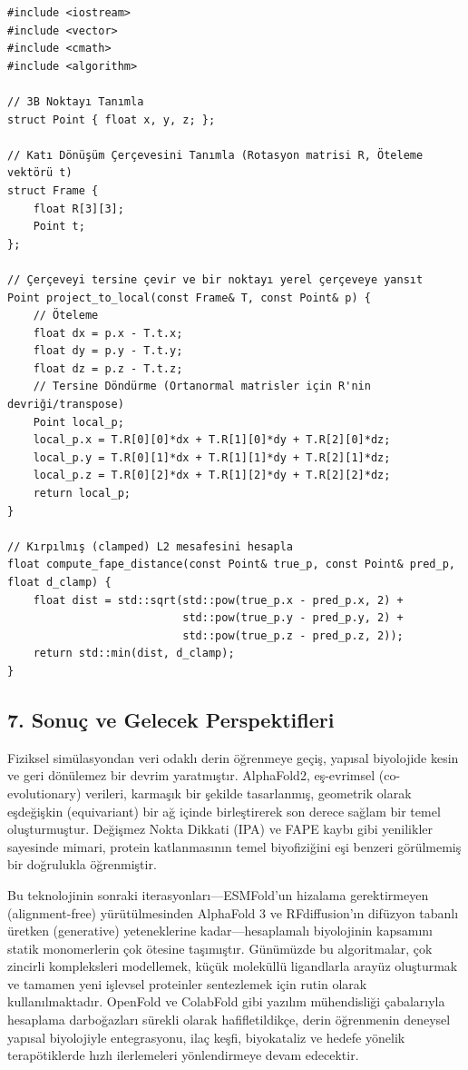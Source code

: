 \documentclass[11pt,a4paper]{article}
\begin{document}
\begin{Verbatim}[breaklines=true,breakanywhere=true,fontsize=\small]
#include <iostream>
#include <vector>
#include <cmath>
#include <algorithm>

// 3B Noktayı Tanımla
struct Point { float x, y, z; };

// Katı Dönüşüm Çerçevesini Tanımla (Rotasyon matrisi R, Öteleme vektörü t)
struct Frame {
    float R[3][3];
    Point t;
};

// Çerçeveyi tersine çevir ve bir noktayı yerel çerçeveye yansıt
Point project_to_local(const Frame& T, const Point& p) {
    // Öteleme
    float dx = p.x - T.t.x;
    float dy = p.y - T.t.y;
    float dz = p.z - T.t.z;
    // Tersine Döndürme (Ortanormal matrisler için R'nin devriği/transpose)
    Point local_p;
    local_p.x = T.R[0][0]*dx + T.R[1][0]*dy + T.R[2][0]*dz;
    local_p.y = T.R[0][1]*dx + T.R[1][1]*dy + T.R[2][1]*dz;
    local_p.z = T.R[0][2]*dx + T.R[1][2]*dy + T.R[2][2]*dz;
    return local_p;
}

// Kırpılmış (clamped) L2 mesafesini hesapla
float compute_fape_distance(const Point& true_p, const Point& pred_p, float d_clamp) {
    float dist = std::sqrt(std::pow(true_p.x - pred_p.x, 2) + 
                           std::pow(true_p.y - pred_p.y, 2) + 
                           std::pow(true_p.z - pred_p.z, 2));
    return std::min(dist, d_clamp);
}
\end{Verbatim}
\subsection{7. Sonuç ve Gelecek Perspektifleri}
Fiziksel simülasyondan veri odaklı derin öğrenmeye geçiş, yapısal biyolojide kesin ve geri dönülemez bir devrim yaratmıştır. AlphaFold2, eş-evrimsel (co-evolutionary) verileri, karmaşık bir şekilde tasarlanmış, geometrik olarak eşdeğişkin (equivariant) bir ağ içinde birleştirerek son derece sağlam bir temel oluşturmuştur. Değişmez Nokta Dikkati (IPA) ve FAPE kaybı gibi yenilikler sayesinde mimari, protein katlanmasının temel biyofiziğini eşi benzeri görülmemiş bir doğrulukla öğrenmiştir.

Bu teknolojinin sonraki iterasyonları—ESMFold'un hizalama gerektirmeyen (alignment-free) yürütülmesinden AlphaFold 3 ve RFdiffusion'ın difüzyon tabanlı üretken (generative) yeteneklerine kadar—hesaplamalı biyolojinin kapsamını statik monomerlerin çok ötesine taşımıştır. Günümüzde bu algoritmalar, çok zincirli kompleksleri modellemek, küçük moleküllü ligandlarla arayüz oluşturmak ve tamamen yeni işlevsel proteinler sentezlemek için rutin olarak kullanılmaktadır. OpenFold ve ColabFold gibi yazılım mühendisliği çabalarıyla hesaplama darboğazları sürekli olarak hafifletildikçe, derin öğrenmenin deneysel yapısal biyolojiyle entegrasyonu, ilaç keşfi, biyokataliz ve hedefe yönelik terapötiklerde hızlı ilerlemeleri yönlendirmeye devam edecektir.
\end{document}
